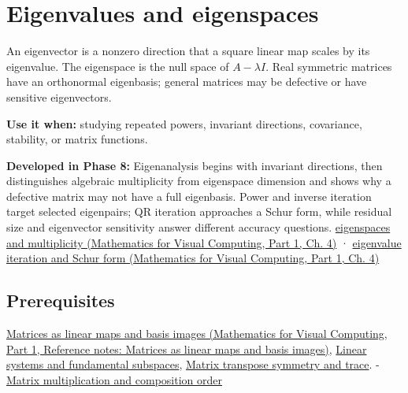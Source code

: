 \hypertarget{appendix-0b3be18411f9}{}\label{referencestart:appendix-0b3be18411f9}
\section{Eigenvalues and eigenspaces}\label{appendix-0b3be18411f9-eigenvalues-and-eigenspaces}

\hypertarget{appendix-0b3be18411f9-eigenvalues-and-eigenspaces}{}

An eigenvector is a nonzero direction that a square linear map scales by its eigenvalue. The eigenspace is the null space of \(A-\lambda I\). Real symmetric matrices have an orthonormal eigenbasis; general matrices may be defective or have sensitive eigenvectors.

\textbf{Use it when:} studying repeated powers, invariant directions, covariance, stability, or matrix functions.

\textbf{Developed in Phase 8:} Eigenanalysis begins with invariant directions, then distinguishes algebraic multiplicity from eigenspace dimension and shows why a defective matrix may not have a full eigenbasis. Power and inverse iteration target selected eigenpairs; QR iteration approaches a Schur form, while residual size and eigenvector sensitivity answer different accuracy questions. \href{../02-Mathematics-for-Visual-Computing-P01/main.pdf\#nameddest=01-foundations-i-ch020-eigenvalues-eigenspaces-and-the-two-kinds-of-multiplicity}{eigenspaces and multiplicity (Mathematics for Visual Computing, Part 1, Ch. 4)} · \href{../02-Mathematics-for-Visual-Computing-P01/main.pdf\#nameddest=01-foundations-i-ch020-qr-iteration-and-jacobi-rotations-preserve-the-spectrum-while-simplifying-shape}{eigenvalue iteration and Schur form (Mathematics for Visual Computing, Part 1, Ch. 4)}

\subsection{Prerequisites}\label{appendix-0b3be18411f9-prerequisites}

\hypertarget{appendix-0b3be18411f9-prerequisites}{}

\href{../02-Mathematics-for-Visual-Computing-P01/main.pdf\#nameddest=appendix-bd39c3bf5d64}{Matrices as linear maps and basis images (Mathematics for Visual Computing, Part 1, Reference notes: Matrices as linear maps and basis images)}, \hyperref[appendix-8572a4a060c1]{Linear systems and fundamental subspaces}, \hyperref[appendix-175ca5ff874d]{Matrix transpose symmetry and trace}. - \hyperref[appendix-ab31ef447dbf]{Matrix multiplication and composition order}

